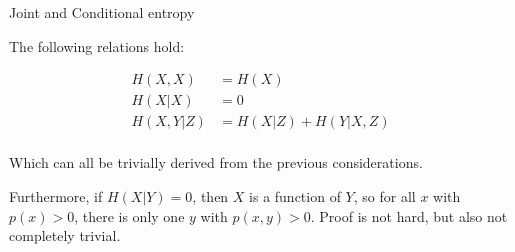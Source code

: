 \documentclass[11pt,compress,t,notes=noshow, xcolor=table]{beamer}
\begin{document}

\begin{vbframe} {Joint and Conditional entropy}

The following relations hold:

\begin{equation*}
\begin{aligned}
H(X, X)       &= H(X)  \\
H(X | X)      &= 0  \\
H(X, Y | Z)   &=H(X | Z)+H(Y | X, Z)\\
\end{aligned}
\end{equation*}

Which can all be trivially derived from the previous considerations.

\lz

Furthermore, if $H(X|Y) = 0$, then $X$ is a function of $Y$, so for all $x$ with $p(x)>0$, there is only one $y$ with $p(x,y)>0$. 
Proof is not hard, but also not completely trivial.
\end{vbframe}
\end{document}
